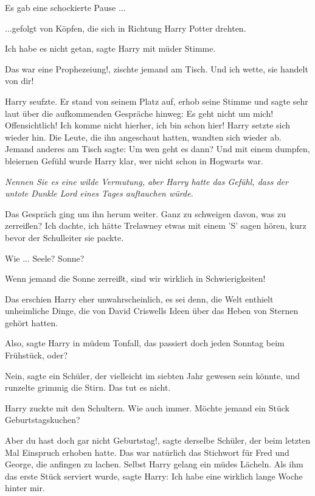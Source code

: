 Es gab eine schockierte Pause ...

...gefolgt von Köpfen, die sich in Richtung Harry Potter drehten.

\glqq{}Ich habe es nicht getan\grqq{}, sagte Harry mit müder Stimme.

\glqq{}Das war eine Prophezeiung!\grqq{}, zischte jemand am Tisch. \glqq{}Und ich
wette, sie handelt von dir!\grqq{}

Harry seufzte. Er stand von seinem Platz auf, erhob seine Stimme und sagte sehr
laut über die aufkommenden Gespräche hinweg: \glqq{}Es geht nicht um mich!
Offensichtlich! Ich komme nicht hierher, ich bin schon hier!\grqq{} Harry setzte
sich wieder hin. Die Leute, die ihn angeschaut hatten, wandten sich wieder ab.
Jemand anderes am Tisch sagte: \glqq{}Um wen geht es dann?\grqq{} Und mit einem
dumpfen, bleiernen Gefühl wurde Harry klar, wer nicht schon in Hogwarts war.

\emph{Nennen Sie es eine wilde Vermutung, aber Harry hatte das Gefühl, dass der
untote Dunkle Lord eines Tages auftauchen würde.}

Das Gespräch ging um ihn herum weiter. \glqq{}Ganz zu schweigen davon, was zu
zerreißen?\grqq{} \glqq{}Ich dachte, ich hätte Trelawney etwas mit einem 'S'
sagen hören, kurz bevor der Schulleiter sie packte.\grqq{}

\glqq{}Wie ... Seele? Sonne?\grqq{}

\glqq{}Wenn jemand die Sonne zerreißt, sind wir wirklich in
Schwierigkeiten!\grqq{}

Das erschien Harry eher unwahrscheinlich, es sei denn, die Welt enthielt
unheimliche Dinge, die von David Criswells Ideen über das Heben von Sternen
gehört hatten.

\glqq{}Also\grqq{}, sagte Harry in müdem Tonfall, \glqq{}das passiert doch jeden
Sonntag beim Frühstück, oder?\grqq{}

\glqq{}Nein\grqq{}, sagte ein Schüler, der vielleicht im siebten Jahr gewesen
sein könnte, und runzelte grimmig die Stirn. \glqq{}Das tut es nicht.\grqq{}

Harry zuckte mit den Schultern. \glqq{}Wie auch immer. Möchte jemand ein Stück
Geburtstagskuchen?\grqq{}

\glqq{}Aber du hast doch gar nicht Geburtstag!\grqq{}, sagte derselbe Schüler,
der beim letzten Mal Einspruch erhoben hatte. Das war natürlich das Stichwort
für Fred und George, die anfingen zu lachen. Selbst Harry gelang ein müdes
Lächeln. Als ihm das erste Stück serviert wurde, sagte Harry: \glqq{}Ich habe
eine wirklich lange Woche hinter mir.\grqq{}

